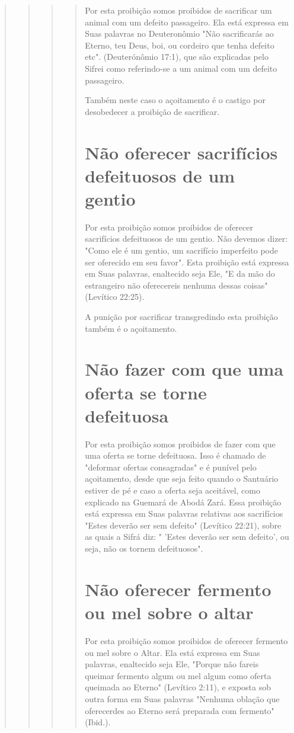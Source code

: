 \begin{quote}
\begin{quote}
\begin{quote}
\begin{quote}
Por esta proibição somos proibidos de sacrificar um animal com um
defeito passageiro. Ela está expressa em Suas palavras no Deuteronômio
"Não sacrificarás ao Eterno, teu Deus, boi, ou cordeiro que tenha
defeito etc". (Deu­terónômio 17:1), que são explicadas pelo Sifrei como
referindo-se a um animal com um defeito passageiro.

Também neste caso o açoitamento é o castigo por desobedecer a proi­bição
de sacrificar.


\section{Não oferecer sacrifícios defeituosos de um gentio}

Por esta proibição somos proibidos de oferecer sacrifícios defeituo­sos
de um gentio. Não devemos dizer: "Como ele é um gentio, um sacrifício
imperfeito pode ser oferecido em seu favor". Esta proibição está
expressa em Suas palavras, enaltecido seja Ele, "E da mão do estrangeiro
não oferecereis ne­nhuma dessas coisas" (Levítico 22:25).

A punição por sacrificar transgredindo esta proibição também é o
açoitamento.

\section{Não fazer com que uma oferta se torne defeituosa}

Por esta proibição somos proibidos de fazer com que uma oferta se torne
defeituosa. Isso é chamado de "deformar ofertas consagradas" e é
puní­vel pelo açoitamento, desde que seja feito quando o Santuário
estiver de pé e caso a oferta seja aceitável, como explicado na Guemará
de Abodá Zará. Essa proibição está expressa em Suas palavras relativas
aos sacrifícios "Estes deve­rão ser sem defeito" (Levítico 22:21), sobre
as quais a Sifrá diz: " 'Estes deve­rão ser sem defeito', ou seja, não
os tornem defeituosos".

\section{Não oferecer fermento ou mel sobre o altar}

Por esta proibição somos proibidos de oferecer fermento ou mel so­bre o
Altar. Ela está expressa em Suas palavras, enaltecido seja Ele, "Porque
não fareis queimar fermento algum ou mel algum como oferta queimada ao
Eter­no" (Levítico 2:11), e exposta sob outra forma em Suas palavras
"Nenhuma obla­ção que oferecerdes ao Eterno será preparada com fermento"
(Ibid.).


\end{quote}
\end{quote}
\end{quote}
\end{quote}
